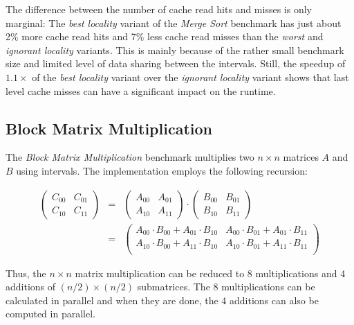 The difference between the number of cache read hits and misses is
only marginal: The \emph{best locality} variant of the \emph{Merge
  Sort} benchmark has just about 2\% more cache read hits and 7\% less
cache read misses than the \emph{worst} and \emph{ignorant locality}
variants. This is mainly because of the rather small benchmark size
and limited level of data sharing between the intervals. Still, the
speedup of $1.1\times$ of the \emph{best locality} variant over the
\emph{ignorant locality} variant shows that last level cache misses
can have a significant impact on the runtime.


\subsection{Block Matrix Multiplication}
\label{sec:locality-performance-matmult}

The \emph{Block Matrix Multiplication} benchmark multiplies two $n
\times n$ matrices $A$ and $B$ using intervals. The implementation
employs the following recursion:

\begin{eqnarray*}
  \begin{pmatrix}
    C_{00} & C_{01} \\
    C_{10} & C_{11}
  \end{pmatrix}
  &
  =
  &
  \begin{pmatrix}
    A_{00} & A_{01} \\
    A_{10} & A_{11}
  \end{pmatrix}
  \cdot
  \begin{pmatrix}
    B_{00} & B_{01} \\
    B_{10} & B_{11}
  \end{pmatrix}
  \\[0.2cm]
  &
  =
  &
  \begin{pmatrix}
    A_{00} \cdot B_{00} + A_{01} \cdot B_{10} & A_{00} \cdot B_{01} + A_{01} \cdot B_{11} \\
    A_{10} \cdot B_{00} + A_{11} \cdot B_{10} & A_{10} \cdot B_{01} + A_{11} \cdot B_{11} \\
  \end{pmatrix}
\end{eqnarray*}

Thus, the $n \times n$ matrix multiplication can be reduced to 8
multiplications and 4 additions of $(n/2) \times (n/2)$
submatrices. The 8 multiplications can be calculated in parallel and
when they are done, the 4 additions can also be computed in parallel.

